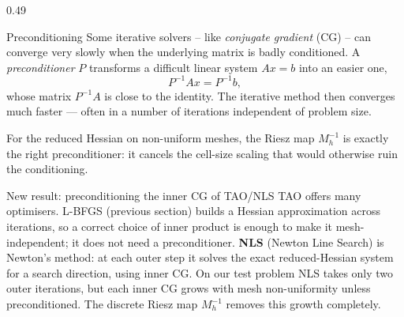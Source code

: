 \documentclass[final]{beamer}
\begin{document}
\begin{frame}[t]
\begin{columns}[t,totalwidth=\dimexpr\paperwidth-3cm\relax]
\begin{column}{0.49\dimexpr\paperwidth-3cm\relax}
\begin{block}{Preconditioning}
Some iterative solvers -- like \emph{conjugate gradient} (CG) -- can converge very slowly when the underlying matrix is badly conditioned. A \emph{preconditioner} $P$ transforms a difficult linear system $Ax = b$ into an easier one,
\[
P^{-1}Ax = P^{-1}b,
\]
whose matrix $P^{-1}A$ is close to the identity. The iterative method then converges much faster --- often in a number of iterations independent of problem size.

For the reduced Hessian on non-uniform meshes, the Riesz map $M_h^{-1}$ is exactly the right preconditioner: it cancels the cell-size scaling that would otherwise ruin the conditioning.
\end{block}

\begin{alertblock}{New result: preconditioning the inner CG of TAO/NLS}
TAO offers many optimisers. L-BFGS (previous section) builds a Hessian approximation across iterations, so a correct choice of inner product is enough to make it mesh-independent; it does not need a preconditioner. \textbf{NLS} (Newton Line Search) is Newton's method: at each outer step it solves the exact reduced-Hessian system for a search direction, using inner CG. On our test problem NLS takes only two outer iterations, but each inner CG grows with mesh non-uniformity unless preconditioned. The discrete Riesz map $M_h^{-1}$ removes this growth completely.

\vspace{0.3em}
\centering
{}


\end{alertblock}
\end{column}
\end{columns}
\end{frame}
\end{document}

